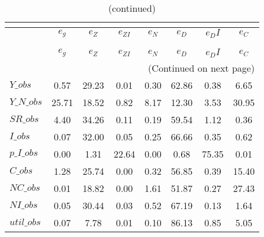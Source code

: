 
\begin{center}
\begin{longtable}{lccccccc} 
\caption{VARIANCE DECOMPOSITION (in percent)}\\
 \label{Table:th_var_decomp_uncond}\\
\toprule 
$           $	 & 	 $       {e_g}$	 & 	 $       {e_Z}$	 & 	 $    {e_{ZI}}$	 & 	 $       {e_N}$	 & 	 $       {e_D}$	 & 	 $      {e_DI}$	 & 	 $       {e_C}$\\
\midrule \endfirsthead 
\caption{(continued)}\\
 \toprule \\ 
$           $	 & 	 $       {e_g}$	 & 	 $       {e_Z}$	 & 	 $    {e_{ZI}}$	 & 	 $       {e_N}$	 & 	 $       {e_D}$	 & 	 $      {e_DI}$	 & 	 $       {e_C}$\\
\midrule \endhead 
\midrule \multicolumn{8}{r}{(Continued on next page)} \\ \bottomrule \endfoot 
\bottomrule \endlastfoot 
$Y\_obs     $	 & 	        0.57	 & 	       29.23	 & 	        0.01	 & 	        0.30	 & 	       62.86	 & 	        0.38	 & 	        6.65 \\ 
$Y\_N\_obs  $	 & 	       25.71	 & 	       18.52	 & 	        0.82	 & 	        8.17	 & 	       12.30	 & 	        3.53	 & 	       30.95 \\ 
$SR\_obs    $	 & 	        4.40	 & 	       34.26	 & 	        0.11	 & 	        0.19	 & 	       59.54	 & 	        1.12	 & 	        0.36 \\ 
$I\_obs     $	 & 	        0.07	 & 	       32.00	 & 	        0.05	 & 	        0.25	 & 	       66.66	 & 	        0.35	 & 	        0.62 \\ 
$p\_I\_obs  $	 & 	        0.00	 & 	        1.31	 & 	       22.64	 & 	        0.00	 & 	        0.68	 & 	       75.35	 & 	        0.01 \\ 
$C\_obs     $	 & 	        1.28	 & 	       25.74	 & 	        0.00	 & 	        0.32	 & 	       56.85	 & 	        0.39	 & 	       15.40 \\ 
$NC\_obs    $	 & 	        0.01	 & 	       18.82	 & 	        0.00	 & 	        1.61	 & 	       51.87	 & 	        0.27	 & 	       27.43 \\ 
$NI\_obs    $	 & 	        0.05	 & 	       30.44	 & 	        0.03	 & 	        0.52	 & 	       67.19	 & 	        0.13	 & 	        1.64 \\ 
$util\_obs  $	 & 	        0.07	 & 	        7.78	 & 	        0.01	 & 	        0.10	 & 	       86.13	 & 	        0.85	 & 	        5.05 \\ 

\end{longtable}
\end{center}

